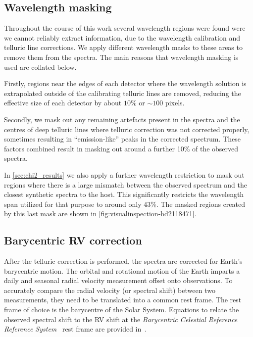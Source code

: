 \subsection{Wavelength masking}
Throughout the course of this work several wavelength regions were found were we cannot reliably extract information, due to the wavelength calibration and telluric line corrections.
We apply different wavelength masks to these areas to remove them from the spectra.
The main reasons that wavelength masking is used are collated below.

Firstly, regions near the edges of each detector where the wavelength solution is extrapolated outside of the calibrating telluric lines are removed, reducing the effective size of each detector by about \(10\%\) or \(\sim100\) pixels.

Secondly, we mask out any remaining artefacts present in the spectra and the centres of deep telluric lines where telluric correction was not corrected properly, sometimes resulting in ``emission-like'' peaks in the corrected spectrum.
These factors combined result in masking out around a further 10\% of the observed spectra.

In \cref{sec:chi2_results} we also apply a further wavelength restriction to mask out regions where there is a large mismatch between the observed spectrum and the closest synthetic spectra to the host.
This significantly restricts the wavelength span utilized for that purpose to around only 43\%.
The masked regions created by this last mask are shown in \cref{fig:visualinspection-hd2118471}.





\subsection{Barycentric RV correction}
\label{{subsec:barycentriccorrection}}
After the telluric correction is performed, the spectra are corrected for Earth's barycentric motion.
The orbital and rotational motion of the Earth imparts a daily and seasonal radial velocity measurement offset onto observations.
To accurately compare the radial velocity (or spectral shift) between two measurements, they need to be translated into a common rest frame.
The rest frame of choice is the barycentre of the Solar System.  Equations to relate the observed spectral shift to the RV shift at the \textit{Barycentric Celestial Reference Reference System}~\citep{rickman_transactions_2001} rest frame are provided in~\citep{lindegren_fundamental_2003}.

